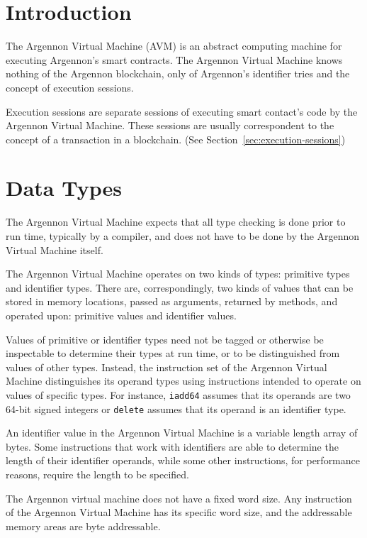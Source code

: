 

\section{Introduction}\label{sec:introduction}

The Argennon Virtual Machine (AVM) is an abstract computing machine for executing Argennon's smart contracts. The
Argennon Virtual Machine knows nothing of the Argennon blockchain, only of Argennon's identifier tries and
the concept of execution sessions.

Execution sessions are separate sessions of executing smart contact's code by the Argennon Virtual Machine.
These sessions are usually correspondent to the concept of a transaction in a blockchain. (See
Section~\ref{sec:execution-sessions})


\section{Data Types}\label{sec:data-types}

The Argennon Virtual Machine expects that all type checking is done prior to run time, typically by a compiler,
and does not have to be done by the Argennon Virtual Machine itself.

The Argennon Virtual Machine operates on two kinds of types: primitive types and identifier types. There are,
correspondingly, two kinds of values that can be stored in memory locations, passed as arguments, returned by
methods, and operated upon: primitive values and identifier values.

Values of primitive or identifier types need not be tagged or otherwise be inspectable to determine their types
at run time, or to be distinguished from values of other types. Instead, the instruction set of the Argennon
Virtual Machine distinguishes its operand types using instructions intended to operate on values of specific
types. For instance, \texttt{iadd64} assumes that its operands are two 64-bit signed integers or \texttt{delete}
assumes that its operand is an identifier type.

An identifier value in the Argennon Virtual Machine is a variable length array of bytes. Some instructions
that work with identifiers are able to determine the length of their identifier operands, while some
other instructions, for performance reasons, require the length to be specified.

The Argennon virtual machine does not have a fixed word size. Any instruction of the Argennon Virtual Machine has
its specific word size, and the addressable memory areas are byte addressable.


